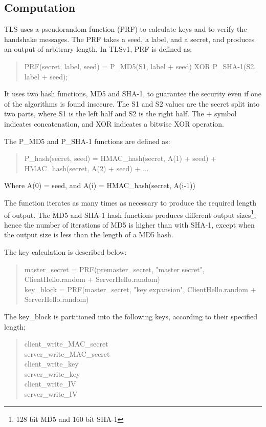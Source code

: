\documentclass[12pt,a4paper,titlepage]{report}
\begin{document}
\subsection{Computation}
\label{sec:computation}
TLS uses a pseudorandom function (PRF) to calculate keys and to verify the handshake messages. The PRF takes a seed, a label, and a secret, and produces an output of arbitrary length. In TLSv1, PRF is defined as: \cite{rfc2246}
\begin{quote}
PRF(secret, label, seed) = P\_MD5(S1, label + seed) XOR P\_SHA-1(S2, label + seed);
\end{quote}
It uses two hash functions, MD5 and SHA-1, to guarantee the security even if one of the algorithms is found insecure. The S1 and S2 values are the secret split into two parts, where S1 is the left half and S2 is the right half. The + symbol indicates concatenation, and XOR indicates a bitwise XOR operation.

The P\_MD5 and P\_SHA-1 functions are defined as:                       
\begin{quote}
P\_hash(secret, seed) = HMAC\_hash(secret, A(1) + seed) + HMAC\_hash(secret, A(2) + seed) +  ...
\end{quote}
Where  A(0) = seed, and A(i) = HMAC\_hash(secret, A(i-1))

The function iterates as many times as necessary to produce the required length of output. The MD5 and SHA-1 hash functions produces different output sizes\footnote{128 bit MD5 and 160 bit SHA-1}, hence the number of iterations of MD5 is higher than with SHA-1, except when the output size is less than the length of a MD5 hash.

The key calculation is described below:

\begin{quote}
master\_secret = PRF(premaster\_secret, "master secret", ClientHello.random + ServerHello.random)\\
key\_block = PRF(master\_secret, "key expansion", ClientHello.random + ServerHello.random)
\end{quote}

The key\_block is partitioned into the following keys, according to their specified length;
\begin{quote}
client\_write\_MAC\_secret\\
server\_write\_MAC\_secret\\
client\_write\_key\\
server\_write\_key\\
client\_write\_IV\\
server\_write\_IV\\
\end{quote}
\end{document}
